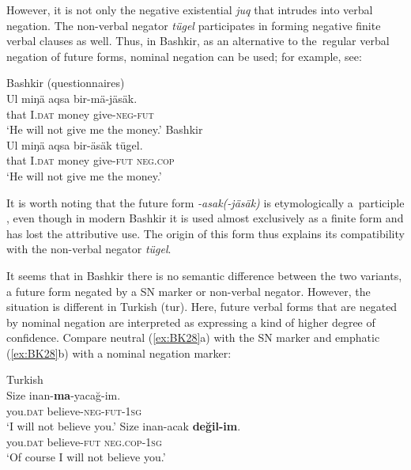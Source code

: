 \documentclass[output=paper]{langsci/langscibook}
\begin{document}
However, it is not only the negative existential \textit{juq} that intrudes into verbal negation. The non-verbal negator \textit{tügel} participates in forming negative finite verbal clauses as well. Thus, in Bashkir, as an alternative to the regular verbal negation of future forms, nominal negation can be used; for example, see:

\ea \label{ex:BK27}
  \ea Bashkir (questionnaires)\\
	\gll Ul		miŋä		aqsa		bir-mä-jäsäk.\\
	that	I.\textsc{dat}		money	give-\textsc{neg-fut}\\
	\glt `He will not give me the money.'
  \ex Bashkir \citep[349]{say2017a}\\
	\gll Ul		miŋä		aqsa		bir-äsäk		tügel.\\
	that	I.\textsc{dat}		money	give-\textsc{fut}	\textsc{neg.cop}\\
	\glt `He will not give me the money.'
\z \z

It is worth noting that the future form \textit{-asak(-jäsäk)} is etymologically a participle \citep[152]{dmitriev1948a}, even though in modern Bashkir it is used almost exclusively as a finite form and has lost the attributive use. The origin of this form thus explains its compatibility with the non-verbal negator \textit{tügel}.

It seems that in Bashkir there is no semantic difference between the two variants, a future form negated by a SN marker or non-verbal negator. However, the situation is different in Turkish (tur). Here, future verbal forms that are negated by nominal negation are interpreted as expressing a kind of higher degree of confidence. Compare neutral (\ref{ex:BK28}a) with the SN marker and emphatic (\ref{ex:BK28}b) with a nominal negation marker:

\ea Turkish \citep[244]{ketrez2012a} \label{ex:BK28}\\
  \ea
	\gll Size		inan-\textbf{ma}-yacağ-im.\\
	you.\textsc{dat}	believe-\textsc{neg-fut-1sg}\\
	\glt `I will not believe you.'
  \ex
	\gll Size		inan-acak		\textbf{değil-im}.\\
	you.\textsc{dat}	believe-\textsc{fut}		\textsc{neg.cop-1sg}\\
	\glt `Of course I will not believe you.'
\z \z
\end{document}
